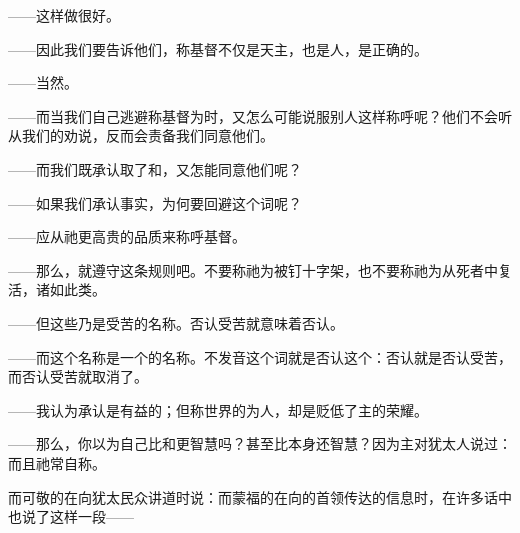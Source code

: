 ——这样做很好。\par

——因此我们要告诉他们，称基督不仅是天主，也是人，是正确的。\par

——当然。\par

——而当我们自己逃避称基督为时，又怎么可能说服别人这样称呼呢？他们不会听从我们的劝说，反而会责备我们同意他们。\par

——而我们既承认取了和，又怎能同意他们呢？\par

——如果我们承认事实，为何要回避这个词呢？\par

——应从祂更高贵的品质来称呼基督。\par

——那么，就遵守这条规则吧。不要称祂为被钉十字架，也不要称祂为从死者中复活，诸如此类。\par

——但这些乃是受苦的名称。否认受苦就意味着否认。\par

——而这个名称是一个的名称。不发音这个词就是否认这个：否认就是否认受苦，而否认受苦就取消了。\par

——我认为承认是有益的；但称世界的为人，却是贬低了主的荣耀。\par

——那么，你以为自己比和更智慧吗？甚至比本身还智慧？因为主对犹太人说过：而且祂常自称。\par

而可敬的在向犹太民众讲道时说：而蒙福的在向的首领传达的信息时，在许多话中也说了这样一段——\par

